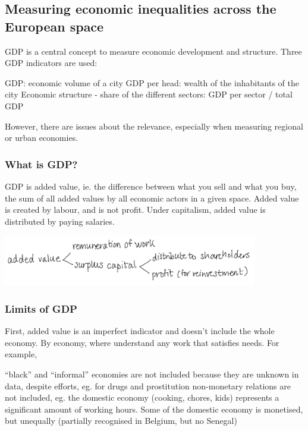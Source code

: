 \documentclass{article}
\begin{document}
\subsection{Measuring economic inequalities across the European space}

GDP is a central concept to measure economic development and structure. 
Three GDP indicators are used:

\begin{outline}
	\1 GDP: economic volume of a city
	\1 GDP per head: wealth of the inhabitants of the city
	\1 Economic structure - share of the different sectors: GDP per sector / total GDP
\end{outline}

However, there are issues about the relevance, especially when measuring regional or urban economies.

\subsubsection{What is GDP?}

GDP is added value, ie. the difference between what you sell and what you buy, the sum of all added values by all economic actors in a given space. 
Added value is created by labour, and is not profit. Under capitalism, added value is distributed by paying salaries.

\begin{center}
\includegraphics[width=30em]{added_value}
\end{center}

\subsubsection{Limits of GDP}

First, added value is an imperfect indicator and doesn't include the whole economy. By economy, where understand any work that satisfies needs. For example,
\begin{outline}
	\1  ``black'' and ``informal'' economies are not included because they are unknown in data, despite efforts, eg. for drugs and prostitution
	\1 non-monetary relations are not included, eg. the domestic economy (cooking, chores, kids) represents a significant amount of working hours. Some of the domestic economy is monetised, but unequally (partially recognised in Belgium, but no Senegal)
\end{outline}
\end{document}
